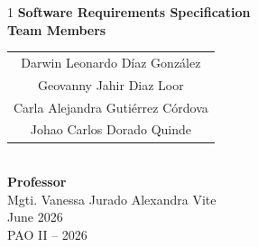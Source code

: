 \documentclass[11pt,a4paper,oneside]{report}
\newcommand{\DocTitle}{Software Requirements Specification}
\begin{document}
\begin{titlepage}
\begin{spacing}{1}
    {\large\bfseries \DocTitle}\\[1.1cm]

    {\large\bfseries Team Members}\\[0.3cm]
    \begin{tabular}{c}
        Darwin Leonardo D\'iaz Gonz\'alez \\
        Geovanny Jahir Diaz Loor \\
        Carla Alejandra Guti\'errez C\'ordova \\
        Johao Carlos Dorado Quinde \\
    \end{tabular}\\[1.1cm]

    {\large\bfseries Professor}\\[0.3cm]
    {Mgti. Vanessa Jurado Alexandra Vite}\\[1.2cm]

    {\large June 2026}\\[0.2cm]
    {\normalsize PAO II -- 2026}

    \end{spacing}
    \vfill
\end{titlepage}

\tableofcontents
\newpage

\listoffigures
\newpage

\listoftables
\newpage
%
%
\end{document}

